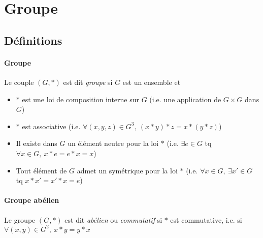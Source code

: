 

\minitoc

\section{Groupe}
	
	\subsection{Définitions}
		
		\traitd
		\paragraph{Groupe}
			Le couple $(G,\ast)$ est dit \emph{groupe} si $G$ est un ensemble et 
			\begin{itemize}
				\item $\ast$ est une loi de composition interne sur $G$ {\footnotesize (i.e. une application de $G\times G$ dans $G$)}
				\item $\ast$ est associative {\footnotesize (i.e. $\forall (x,y,z) \in G^3 ,~(x\ast y)\ast z = x\ast (y\ast z)$)}
				\item Il existe dans $G$ un élément neutre pour la loi $\ast$ {\footnotesize (i.e. $\exists e\in G $ tq $\forall x\in G ,~x\ast e = e\ast x = x$)}
				\item Tout élément de $G$ admet un symétrique pour la loi $\ast$ {\footnotesize (i.e. $\forall x\in G ,~ \exists x'\in G$ tq $x\ast x' = x'\ast x = e$)}
			\end{itemize}
		\traitdouble 
		\paragraph{Groupe abélien}
			Le groupe $(G,\ast)$ est dit \emph{abélien} ou \emph{commutatif} si $\ast$ est commutative, i.e. si $\forall (x,y) \in G^2 ,~x\ast y = y\ast x$ 
		\trait
		
		
		\traitd

